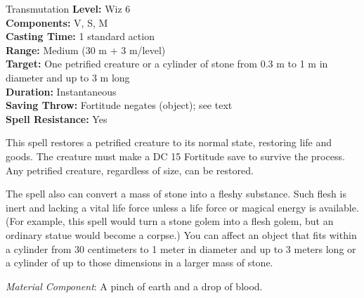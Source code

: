 {Transmutation}
{
	\textbf{Level:}
	Wiz 6\\
	\textbf{Components:}
	V, S, M\\
	\textbf{Casting Time:}
	1 standard action\\
	\textbf{Range:}
	Medium (30 m + 3 m/level)\\
	\textbf{Target:}
	One petrified creature or a cylinder of stone from 0.3 m to 1 m in diameter and up to 3 m long\\
	\textbf{Duration:}
	Instantaneous\\
	\textbf{Saving Throw:}
	Fortitude negates (object); see text\\
	\textbf{Spell Resistance:}
	Yes\\
}
{
	This spell restores a petrified creature to its normal state, restoring life and goods. The creature must make a DC 15 Fortitude save to survive the process. Any petrified creature, regardless of size, can be restored.

	The spell also can convert a mass of stone into a fleshy substance. Such flesh is inert and lacking a vital life force unless a life force or magical energy is available. (For example, this spell would turn a stone golem into a flesh golem, but an ordinary statue would become a corpse.) You can affect an object that fits within a cylinder from 30 centimeters to 1 meter in diameter and up to 3 meters long or a cylinder of up to those dimensions in a larger mass of stone.

	\textit{Material Component}:
	A pinch of earth and a drop of blood.

}
